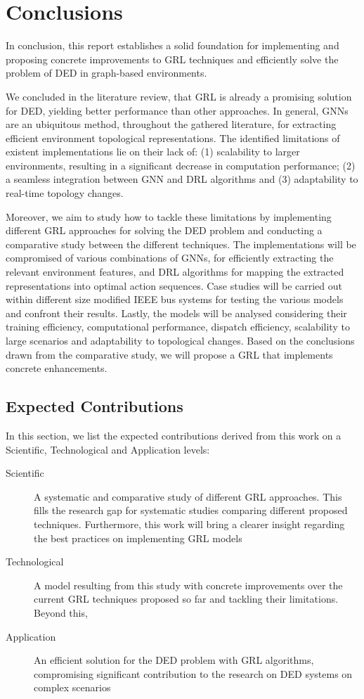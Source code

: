 \chapter{Conclusions} \label{chap:conclusions}

In conclusion, this report establishes a solid foundation for implementing and proposing concrete improvements to \ac{GRL} techniques and efficiently solve the problem of \ac{DED} in graph-based environments. \par
We concluded in the literature review, that \ac{GRL} is already a promising solution for \ac{DED}, yielding better performance than other approaches. In general, \acp{GNN} are an ubiquitous method, throughout the gathered literature, for extracting efficient environment topological representations. The identified limitations of existent implementations lie on their lack of: (1) scalability to larger environments, resulting in a significant decrease in computation performance; (2) a seamless integration between \ac{GNN} and \ac{DRL} algorithms and (3) adaptability to real-time topology changes. \par
Moreover, we aim to study how to tackle these limitations by implementing different \ac{GRL} approaches for solving the \ac{DED} problem and conducting a comparative study between the different techniques. The implementations will be compromised of various combinations of \acp{GNN}, for efficiently extracting the relevant environment features, and \ac{DRL} algorithms for mapping the extracted representations into optimal action sequences. Case studies will be carried out within different size modified IEEE bus systems for testing the various models and confront their results. Lastly, the models will be analysed considering their training efficiency, computational performance, dispatch efficiency, scalability to large scenarios and adaptability to topological changes. Based on the conclusions drawn from the comparative study, we will propose a \ac{GRL} that implements concrete enhancements.

\section{Expected Contributions}

In this section, we list the expected contributions derived from this work on a Scientific, Technological and Application levels:
\begin{description}
	\item[Scientific] A systematic and comparative study of different GRL approaches. This fills the research gap for systematic studies comparing different proposed techniques. Furthermore, this work will bring a clearer insight regarding the best practices on implementing \ac{GRL} models
	\item[Technological] A model resulting from this study with concrete improvements over the current GRL techniques proposed so far and tackling their limitations. Beyond this, 
	\item[Application] An efficient solution for the DED problem with GRL algorithms, compromising significant contribution to the research on \ac{DED} systems on complex scenarios
\end{description}

